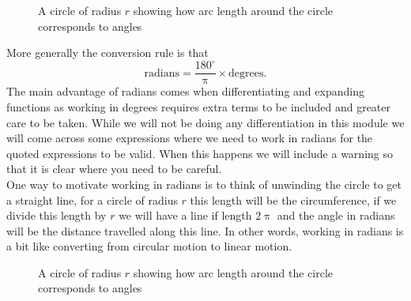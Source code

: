 \documentclass[a4paper,12pt]{book}
\begin{document}
\begin{figure}[ht]
    \centering
    \caption{A circle of radius $r$ showing how arc length around the circle corresponds to angles}
        \label{fig: radians}
\end{figure}

More generally the conversion rule is that
\begin{equation*}
\text{radians} = \frac{180^{\circ}}{\uppi}\times \text{degrees}.
\end{equation*}
The main advantage of radians comes when differentiating and expanding functions as working in degrees requires extra terms to be included and greater care to be taken. While we will not be doing any differentiation in this module we will come across some expressions where we need to work in radians for the quoted expressions to be valid. When this happens we will include a warning so that it is clear where you need to be careful.\\

One way to motivate working in radians is to think of unwinding the circle to get a straight line, for a circle of radius $r$ this length will be the circumference, if we divide this length by $r$ we will have a line if length $2\uppi$ and the angle in radians will be the distance travelled along this line. In other words, working in radians is a bit like converting from circular motion to linear motion.

\begin{figure}[ht]
    \centering
    \caption{A circle of radius $r$ showing how arc length around the circle corresponds to angles}
        \label{fig: radians 2}
\end{figure}
\end{document}
